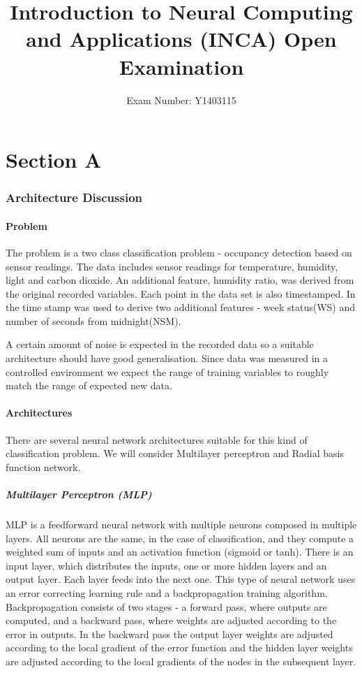 \documentclass[a4paper, 11pt]{article}
\begin{document}
\title{\vspace{-1.0cm}Introduction to Neural Computing and Applications (INCA)
Open Examination}
\author{Exam Number: Y1403115}
\date{\vspace{-0.5cm}}
\maketitle


\part*{Section A}
\section{Architecture Discussion}

\subsection{Problem}
The problem is a two class classification problem - occupancy detection based on sensor readings. The data includes sensor readings for temperature, humidity, light and carbon dioxide. An additional feature, humidity ratio, was derived from the original recorded variables. Each point in the data set is also timestamped. In \cite{Candanedo2016} the time stamp was used to derive two additional features - week status(WS) and number of seconds from midnight(NSM).

A certain amount of noise is expected in the recorded data so a suitable architecture should have good generalisation. Since data was measured in a controlled environment we expect the range of training variables to roughly match the range of expected new data.

\subsection{Architectures}
There are several neural network architectures suitable for this kind of classification problem. We will consider Multilayer perceptron and Radial basis function network. 
\subsubsection{Multilayer Perceptron (MLP)}
MLP is a feedforward neural network with multiple neurons composed in multiple layers. All neurons are the same, in the case of classification, and they compute a weighted sum of inputs and an activation function (sigmoid or tanh). There is an input layer, which distributes the inputs, one or more hidden layers and an output layer. Each layer feeds into the next one. This type of neural network uses an error correcting learning rule and a backpropagation training algorithm. Backpropagation consists of two stages - a forward pass, where outputs are computed, and a backward pass, where weights are adjusted according to the error in outputs. In the backward pass the output layer weights are adjusted according to the local gradient of the error function and the hidden layer weights are adjusted according to the local gradients of the nodes in the subsequent layer. 
\end{document}
